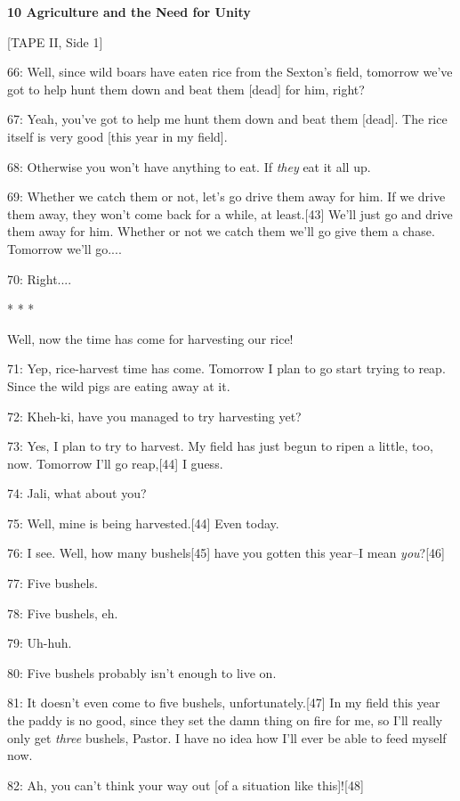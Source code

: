 
\textbf{10 Agriculture and the Need for Unity}

[TAPE II, Side 1]

66: Well, since wild boars have eaten rice from the Sexton's field,  tomorrow we've
got to help hunt them down and beat them [dead] for him, right?

67: Yeah, you've got to help me hunt them down and beat them [dead]. The rice itself
is very good [this year in my field].

68: Otherwise you won't have anything to eat. If \textit{they} eat it all up.

69: Whether we catch them or not, let's go drive them away for him. If we drive
them away, they won't come back for a while, at least.[43] We'll just go and drive
them away for him. Whether or not we catch them we'll go give them a chase. Tomorrow
we'll go....

70: Right....

\begin{center}
* * *
\end{center}

\leftskip=0pt
Well, now the time has come for harvesting our rice!

71: Yep, rice-harvest time has come. Tomorrow I plan to go start trying to reap.
Since the wild pigs are eating away at it.

72: Kheh-ki, have you managed to try harvesting yet?

73: Yes, I plan to try to harvest. My field has just begun to ripen a little, too,
now. Tomorrow I'll go reap,[44] I guess.

74: Jali, what about you?

75: Well, mine is being harvested.[44] Even today.

76: I see. Well, how many bushels[45] have you gotten this year--I mean \emph{you}?[46]

77: Five bushels.

78: Five bushels, eh.

79: Uh-huh.

80: Five bushels probably isn't enough to live on.

81: It doesn't even come to five bushels, unfortunately.[47] In my field this year
the paddy is no good, since they set the damn thing on fire for me, so I'll really
only get \textit{three} bushels, Pastor. I have no idea how I'll ever be able to
feed myself now.

82: Ah, you can't think your way out [of a situation like this]![48]

